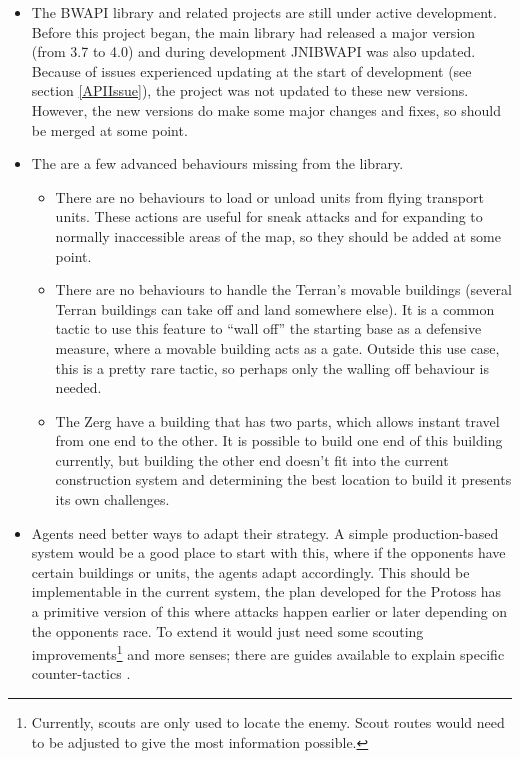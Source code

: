 \documentclass[11pt,openright,a4paper]{report}
\begin{document}
\begin{itemize}
\item{The BWAPI library and related projects are still under active development. Before this project began, the main library had released a major version (from 3.7 to 4.0) and during development JNIBWAPI was also updated. Because of issues experienced updating at the start of development (see section \ref{APIIssue}), the project was not updated to these new versions. However, the new versions do make some major changes and fixes, so should be merged at some point.}
\item{The are a few advanced behaviours missing from the library. 
    \begin{itemize}
        \item{There are no behaviours to load or unload units from flying transport units. These actions are useful for sneak attacks and for expanding to normally inaccessible areas of the map, so they should be added at some point.}
        \item{There are no behaviours to handle the Terran's movable buildings (several Terran buildings can take off and land somewhere else). It is a common tactic to use this feature to ``wall off'' the starting base as a defensive measure, where a movable building acts as a gate. Outside this use case, this is a pretty rare tactic, so perhaps only the walling off behaviour is needed.}
        \item{The Zerg have a building that has two parts, which allows instant travel from one end to the other. It is possible to build one end of this building currently, but building the other end doesn't fit into the current construction system and determining the best location to build it presents its own challenges.}
    \end{itemize}}
\item{Agents need better ways to adapt their strategy. A simple production-based system would be a good place to start with this, where if the opponents have certain buildings or units, the agents adapt accordingly. This should be implementable in the current system, the plan developed for the Protoss has a primitive version of this where attacks happen earlier or later depending on the opponents race. To extend it would just need some scouting improvements\footnote{Currently, scouts are only used to locate the enemy. Scout routes would need to be adjusted to give the most information possible.} and more senses; there are guides available to explain specific counter-tactics \cite{StratWiki}.}

\end{itemize}
\end{document}
